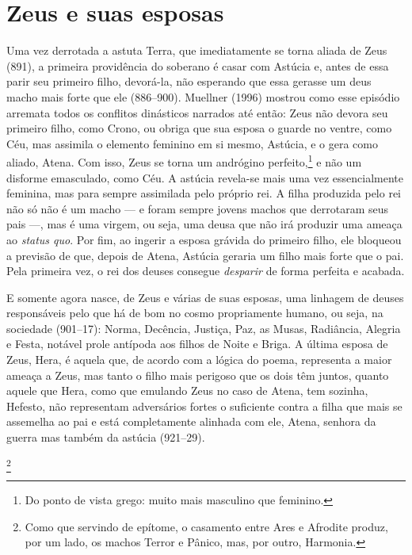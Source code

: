 \section{Zeus e suas esposas}

Uma vez derrotada a astuta Terra, que imediatamente se torna aliada de
Zeus (891), a primeira providência do soberano é casar com Astúcia e,
antes de essa parir seu primeiro filho, devorá-la, não esperando que
essa gerasse um deus macho mais forte que ele (886--900). Muellner (1996)
mostrou como esse episódio arremata todos os conflitos dinásticos
narrados até então: Zeus não devora seu primeiro filho, como Crono, ou
obriga que sua esposa o guarde no ventre, como Céu, mas assimila o
elemento feminino em si mesmo, Astúcia, e o gera como aliado, Atena.
Com isso, Zeus se torna um andrógino perfeito,\footnote{Do ponto de vista grego:
muito mais masculino que feminino.} e não um disforme emasculado, como
Céu. A astúcia revela-se mais uma vez essencialmente feminina, mas para
sempre assimilada pelo próprio rei. A filha produzida pelo rei não só
não é um macho --- e foram sempre jovens machos que derrotaram seus pais
---, mas é uma virgem, ou seja, uma deusa que não irá produzir uma ameaça
ao \textit{status quo}. Por fim, ao ingerir a esposa grávida do primeiro
filho, ele bloqueou a previsão de que, depois de Atena, Astúcia geraria
um filho mais forte que o pai. Pela primeira vez, o rei dos deuses
consegue \textit{desparir} de forma perfeita e acabada.

E somente agora nasce, de Zeus e várias de suas esposas, uma linhagem de
deuses responsáveis pelo que há de bom no cosmo propriamente humano, ou
seja, na sociedade (901--17): Norma, Decência, Justiça, Paz, as Musas,
Radiância, Alegria e Festa, notável prole antípoda aos filhos de Noite e
Briga. A última esposa de Zeus, Hera, é aquela que, de acordo com a
lógica do poema, representa a maior ameaça a Zeus, mas tanto o filho
mais perigoso que os dois têm juntos, quanto aquele que Hera, como que
emulando Zeus no caso de Atena, tem sozinha, Hefesto, não representam
adversários fortes o suficiente contra a filha que mais se assemelha ao
pai e está completamente alinhada com ele, Atena, senhora da guerra mas
também da astúcia (921--29).

\footnote{Como que servindo de epítome, o casamento
entre Ares e Afrodite produz, por um lado, os machos Terror e Pânico,
mas, por outro, Harmonia.} 

